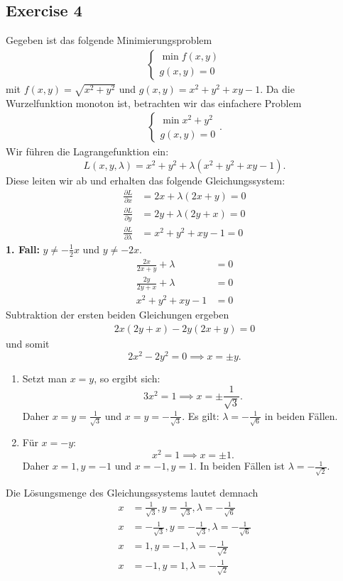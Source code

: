\documentclass[a4paper, landscape,twocolumn,fontsize=9pt]{scrartcl}
\begin{document}
\subsection*{Exercise 4}
Gegeben ist das folgende Minimierungsproblem
\begin{align*}
	\begin{cases}
		\min f(x,y) \\
		g(x,y) = 0
	\end{cases}
\end{align*}
mit $f(x,y) = \sqrt{x^2 + y^2}$ und $g(x,y) = x^2 + y^2 + xy - 1$. Da die Wurzelfunktion monoton ist, betrachten wir das einfachere Problem
\begin{align*}
	\begin{cases}
		\min x^2 + y^2 \\
		g(x,y) = 0
	\end{cases}.
\end{align*}
Wir führen die Lagrangefunktion ein:
\[
	L(x,y,\lambda) = x^2 + y^2 + \lambda(x^2 + y^2 +xy - 1).
\]
Diese leiten wir ab und erhalten das folgende Gleichungssystem:
\begin{align*}
	\frac{\partial L}{\partial x} &= 2x + \lambda(2x + y) = 0 \\
	\frac{\partial L}{\partial y} &= 2y + \lambda(2y + x) = 0 \\
		\frac{\partial L}{\partial \lambda} &= x^2 + y^2 +xy - 1 = 0
\end{align*}
\textbf{1. Fall:} $y \neq -\frac{1}{2}x$ und $y \neq -2x$. 
\begin{align*}
	\frac{2x}{2x + y} + \lambda &= 0 \\
	\frac{2y}{2y + x} + \lambda &= 0 \\ 
	 x^2 + y^2 +xy - 1 &= 0
\end{align*}
Subtraktion der ersten beiden Gleichungen ergeben
\begin{align*}
2x(2y + x) - 2y(2x + y)  = 0
\end{align*}
und somit 
\[
	2x^2 - 2y^2 = 0 \implies x = \pm y.
\]
\begin{enumerate}
\item Setzt man $x = y$, so ergibt sich:
\[
	3x^2 = 1 \implies x = \pm \frac{1}{\sqrt{3}}.
\]
Daher $x = y = \frac{1}{\sqrt{3}}$ und $x = y = -\frac{1}{\sqrt{3}}$. Es gilt: $\lambda = - \frac{1}{\sqrt 6}$ in beiden Fällen.

\item Für $x = -y$:
\[
	x^2 = 1 \implies x = \pm 1.
\]
Daher $x = 1, y= -1$ und $x = -1, y = 1$. In beiden Fällen ist $\lambda = -\frac{1}{\sqrt 2}$.
\end{enumerate}
Die Lösungsmenge des Gleichungssystems lautet demnach
\begin{align*}
	x &= \frac{1}{\sqrt{3}}, y = \frac{1}{\sqrt{3}}, \lambda = -\frac{1}{\sqrt 6} \\
	x &= -\frac{1}{\sqrt{3}}, y = -\frac{1}{\sqrt{3}}, \lambda = -\frac{1}{\sqrt 6} \\
	x &= 1, y = -1, \lambda = -\frac{1}{\sqrt 2} \\
	 x &= -1, y = 1, \lambda = -\frac{1}{\sqrt 2}
\end{align*}
\end{document}
